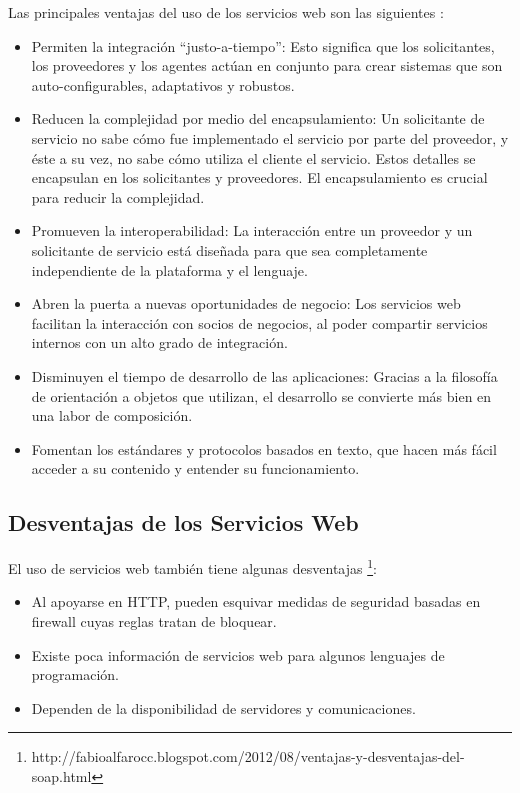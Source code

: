 	Las principales ventajas del uso de los servicios web son las siguientes \citep{doctorado2005}:
\begin{itemize}
	\item Permiten la integración “justo-a-tiempo”:  Esto significa que los solicitantes, los proveedores y los agentes actúan en conjunto para crear sistemas que son auto-configurables, adaptativos y robustos.
	\item Reducen la complejidad por medio del encapsulamiento: Un solicitante de servicio no sabe cómo fue implementado el servicio por parte del proveedor, y éste a su vez, no sabe cómo utiliza el cliente el servicio. Estos detalles se encapsulan en los solicitantes y proveedores. El encapsulamiento es crucial para reducir la complejidad.
	\item Promueven la interoperabilidad: La interacción entre un proveedor y un solicitante de servicio está diseñada para que sea completamente independiente de la plataforma y el lenguaje. 
	\item Abren la puerta a nuevas oportunidades de negocio: Los servicios web facilitan la interacción con socios de negocios, al poder compartir servicios internos con un alto grado de integración.
	\item Disminuyen el tiempo de desarrollo de las aplicaciones: Gracias a la filosofía de orientación a objetos que utilizan, el desarrollo se convierte más bien en una labor de composición.
	\item Fomentan los estándares y protocolos basados en texto, que hacen más fácil acceder a su contenido y entender su funcionamiento.
\end{itemize}


\subsection{Desventajas de los  Servicios Web}
\label{cap:subsec:desventajasserviciosweb}
	El uso de servicios web también tiene algunas desventajas \footnote{http://fabioalfarocc.blogspot.com/2012/08/ventajas-y-desventajas-del-soap.html}:
\begin{itemize}
	\item Al apoyarse en HTTP, pueden esquivar medidas de seguridad basadas en firewall cuyas reglas tratan de bloquear.
	\item Existe poca información de servicios web para algunos lenguajes de programación.
	\item Dependen de la disponibilidad de servidores y comunicaciones.
\end{itemize}




